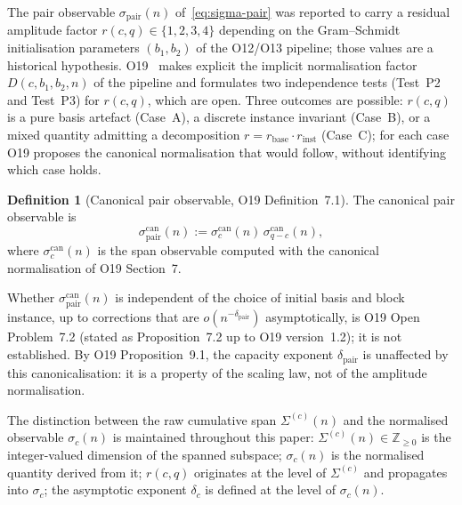 \documentclass[11pt,a4paper]{article}
\theoremstyle{definition}
\newtheorem{definition}[theorem]{Definition}
\theoremstyle{remark}
\begin{document}
      The pair observable $\sigma_{\mathrm{pair}}(n)$
      of~\eqref{eq:sigma-pair} was reported to carry a residual amplitude factor
      $r(c,q) \in \{1,2,3,4\}$ depending on the Gram--Schmidt
      initialisation parameters $(b_1, b_2)$ of the O12/O13 pipeline; those values are a
      historical hypothesis.
      O19~\cite{Beau2026a23} makes explicit the implicit normalisation factor
      $D(c, b_1, b_2, n)$ of the pipeline and formulates two independence tests
      (Test~P2 and Test~P3) for $r(c,q)$, which are open.
      Three outcomes are possible: $r(c,q)$ is a pure basis artefact
      (Case~A), a discrete instance invariant (Case~B), or a mixed
      quantity admitting a decomposition
      $r = r_{\mathrm{base}} \cdot r_{\mathrm{inst}}$ (Case~C); for each case O19 proposes the
      canonical normalisation that would follow, without identifying which case holds.

      \begin{definition}[Canonical pair observable, O19 Definition~7.1]
        \label{def:sigma-can}
        The canonical pair observable is
        \[
          \sigma_{\mathrm{pair}}^{\mathrm{can}}(n)
          := \sigma_c^{\mathrm{can}}(n)\,\sigma_{q-c}^{\mathrm{can}}(n),
        \]
        where $\sigma_c^{\mathrm{can}}(n)$ is the span observable computed
        with the canonical normalisation of O19 Section~7.
      \end{definition}

      Whether $\sigma_{\mathrm{pair}}^{\mathrm{can}}(n)$ is independent of the
      choice of initial basis and block instance, up to corrections that
      are $o(n^{-\delta_{\mathrm{pair}}})$ asymptotically, is O19 Open Problem~7.2
      (stated as Proposition~7.2 up to O19 version~1.2); it is not established.
      By O19 Proposition~9.1, the capacity exponent
      $\delta_{\mathrm{pair}}$ is unaffected by this canonicalisation: it
      is a property of the scaling law, not of the amplitude
      normalisation.

      The distinction between the raw cumulative span $\Sigma^{(c)}(n)$
      and the normalised observable $\sigma_c(n)$ is maintained
      throughout this paper: $\Sigma^{(c)}(n) \in \mathbb{Z}_{\geq 0}$
      is the integer-valued dimension of the spanned subspace;
      $\sigma_c(n)$ is the normalised quantity derived from it;
      $r(c,q)$ originates at the level of $\Sigma^{(c)}$ and propagates
      into $\sigma_c$; the asymptotic exponent $\delta_c$ is defined at
      the level of $\sigma_c(n)$.
\end{document}
